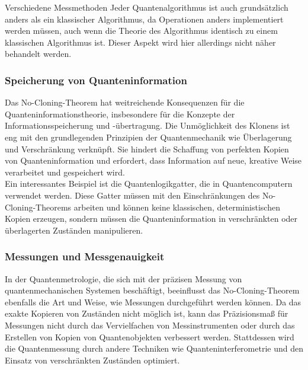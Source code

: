 \begin{tcolorbox}[title=Kommentar,
    title filled=false,
    colback=cyan!5!white,
    colframe=cyan!75!black]
Verschiedene Messmethoden
Jeder Quantenalgorithmus ist auch grundsätzlich anders als ein klassischer Algorithmus, da Operationen anders implementiert
werden müssen, auch wenn die Theorie des Algorithmus identisch zu einem klassischen Algorithmus ist.
    Dieser Aspekt wird hier allerdings nicht näher behandelt werden.
\end{tcolorbox}

\subsubsection{Speicherung von Quanteninformation}
Das No-Cloning-Theorem hat weitreichende Konsequenzen für die Quanteninformationstheorie,
insbesondere für die Konzepte der Informationsspeicherung und -übertragung.
Die Unmöglichkeit des Klonens ist eng mit den grundlegenden Prinzipien der Quantenmechanik wie Überlagerung und Verschränkung verknüpft.
Sie hindert die Schaffung von perfekten Kopien von Quanteninformation und erfordert, dass Information auf neue, kreative Weise verarbeitet und gespeichert wird.\\

Ein interessantes Beispiel ist die Quantenlogikgatter, die in Quantencomputern verwendet werden.
Diese Gatter müssen mit den Einschränkungen des No-Cloning-Theorems arbeiten und können keine klassischen,
deterministischen Kopien erzeugen, sondern müssen die Quanteninformation in verschränkten oder überlagerten Zuständen manipulieren.

\subsubsection{Messungen und Messgenauigkeit}

In der Quantenmetrologie, die sich mit der präzisen Messung von quantenmechanischen Systemen beschäftigt,
beeinflusst das No-Cloning-Theorem ebenfalls die Art und Weise, wie Messungen durchgeführt werden können.
Da das exakte Kopieren von Zuständen nicht möglich ist, kann das Präzisionsmaß für Messungen nicht durch das
Vervielfachen von Messinstrumenten oder durch das Erstellen von Kopien von Quantenobjekten verbessert werden.
Stattdessen wird die Quantenmessung durch andere Techniken wie
Quanteninterferometrie und den Einsatz von verschränkten Zuständen optimiert.



